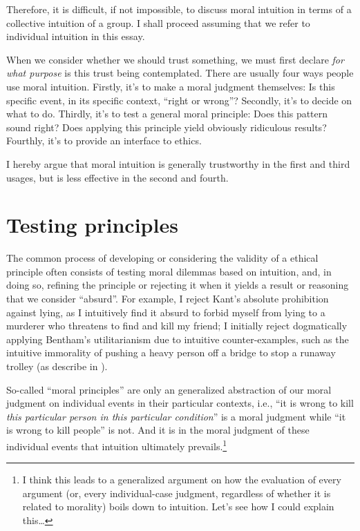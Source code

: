 \documentclass{scrartcl}
\begin{document}
Therefore, it is difficult, if not impossible, to discuss moral intuition in terms of a collective intuition of a group. I shall proceed assuming that we refer to individual intuition in this essay.

\bigskip

When we consider whether we should trust something, we must first declare \emph{for what purpose} is this trust being contemplated. There are usually four ways people use moral intuition. Firstly, it's to make a moral judgment themselves: Is this specific event, in its specific context, ``right or wrong''? Secondly, it's to decide on what to do. Thirdly, it's to test a general moral principle: Does this pattern sound right? Does applying this principle yield obviously ridiculous results? Fourthly, it's to provide an interface to ethics.

I hereby argue that moral intuition is generally trustworthy in the first and third usages, but is less effective in the second and fourth. %

\section{Testing principles}

The common process of developing or considering the validity of a ethical principle often consists of testing moral dilemmas based on intuition, and, in doing so, refining the principle or rejecting it when it yields a result or reasoning that we consider ``absurd''. For example, I reject Kant's absolute prohibition against lying, as I intuitively find it absurd to forbid myself from lying to a murderer who threatens to find and kill my friend; I initially reject dogmatically applying Bentham's utilitarianism due to intuitive counter-examples, such as the intuitive immorality of pushing a heavy person off a bridge to stop a runaway trolley (as describe in \autocite[21]{justice}).

So-called ``moral principles'' are only an generalized abstraction of our moral judgment on individual events in their particular contexts, i.e., ``it is wrong to kill \emph{this particular person in this particular condition}'' is a moral judgment while ``it is wrong to kill people'' is not. And it is in the moral judgment of these individual events that intuition ultimately prevails.\footnote{I think this leads to a generalized argument on how the evaluation of every argument (or, every individual-case judgment, regardless of whether it is related to morality) boils down to intuition. Let's see how I could explain this\ldots{}}
 
\end{document}
